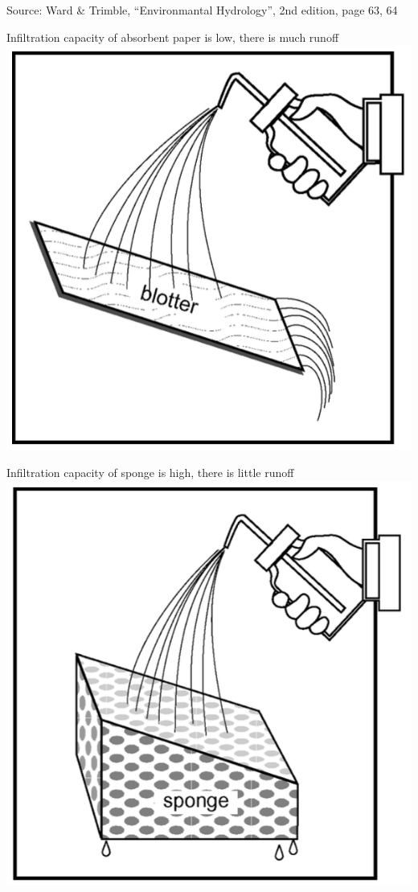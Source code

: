 \documentclass[
  letterpaper,
  DIV=11,
  numbers=noendperiod]{scrreprt}
\begin{document}
Source: Ward \& Trimble, ``Environmantal Hydrology'', 2nd edition, page
63, 64

Infiltration capacity of absorbent paper is low, there is much runoff
\includegraphics{archive/figures/ward_and_trimble_infiltration_capacity1.png}

Infiltration capacity of sponge is high, there is little runoff
\includegraphics{archive/figures/ward_and_trimble_infiltration_capacity2.png}
\end{document}
